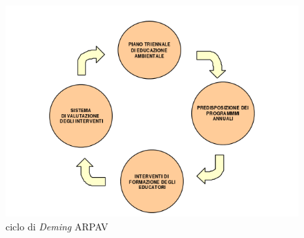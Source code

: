 \begin{figure}[htbp]
\includegraphics[scale=0.8]{./capitoli/capitolo1/img/pdca}
	\caption{ciclo di \textit{Deming} ARPAV}
\end{figure}
